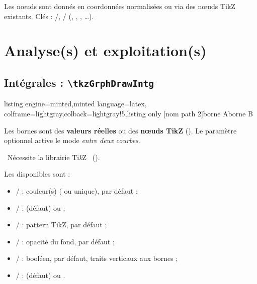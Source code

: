 \documentclass[11pt,a4paper]{ltxdoc}
\providecommand\tikzlogo{Ti\textit{k}Z}
\let\TikZ\tikzlogo
\begin{document}
Les nœuds sont donnés en coordonnées normalisées ou via des nœuds TikZ existants. Clés : /, / (, , \MontreCode{+}, \ldots).

\pagebreak

\section{Analyse(s) et exploitation(s)}

\subsection{Intégrales : \texttt{\textbackslash tkzGrphDrawIntg}}

\begin{tcblisting}{listing engine=minted,minted language=latex,
  colframe=lightgray,colback=lightgray!5,listing only}
[nom path 2]{borne A}{borne B}
\end{tcblisting}

Les bornes sont des \textbf{valeurs réelles} ou des \textbf{nœuds TikZ} (). Le paramètre optionnel  active le mode \textit{entre deux courbes}.

\smallskip

{\footnotesize\faBomb}~Nécessite la librairie \TikZ\  ().

\smallskip

Les \MontreCode{[clés]} disponibles sont :

\begin{itemize}
	\item {} /  : couleur(s) ( ou unique),  par défaut ;
	\item {} /  :  (défaut) ou  ;
	\item {} /  : pattern TikZ,  par défaut ;
	\item {} /  : opacité du fond,  par défaut ;
	\item {} /  : booléen,  par défaut, traits verticaux aux bornes ;
	\item {} /  :  (défaut) ou .
\end{itemize}
\end{document}
